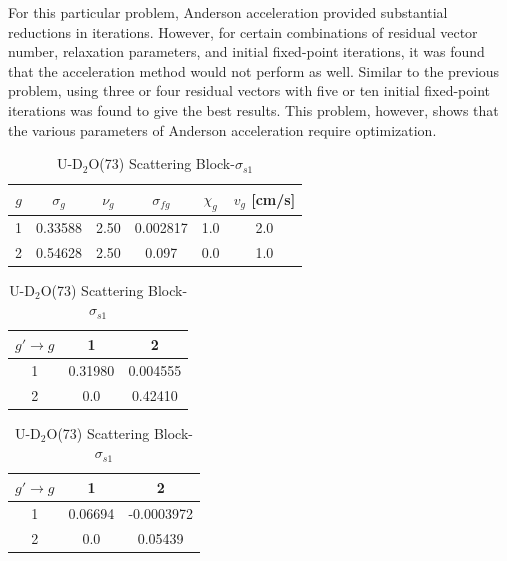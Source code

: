 For this particular problem, Anderson acceleration provided substantial reductions in iterations. However, for certain combinations of residual vector number, relaxation parameters, and initial fixed-point iterations, it was found that the acceleration method would not perform as well. Similar to the previous problem, using three or four residual vectors with five or ten initial fixed-point iterations was found to give the best results. This problem, however, shows that the various parameters of Anderson acceleration require optimization.

\begin{table}[!htbp]
	\caption{Two-Group U-D$_{2}$O Problem Cross Sections (cm$^{-1}$)}
	\label{table:D2O-Sood73}
	\begin{subtable}[!htbp]{1.0\textwidth}
		\centering{}
		\begin{tabular}{@{}cccccc@{}}\toprule
			$g$ & $\sigma_{g} $ & $\nu_{g}$ & $\sigma_{fg}$ & $\chi_{g}$ & $v_{g}$ [cm/s] \\ 
        			\midrule
			1 & 0.33588  & 2.50 & 0.002817 & 1.0 & 2.0 \\
			2 & 0.54628  & 2.50 & 0.097 & 0.0 & 1.0 \\
			\bottomrule
		\end{tabular}
	\caption{U-D$_{2}$O(73) Cross Sections}
	\end{subtable}%
	\vspace{0.25cm}
	\begin{subtable}[!htbp]{1.0\textwidth}
	\centering{}
	\begin{tabular}{@{}ccc@{}}\toprule
	$g' \rightarrow g$ & 1 & 2 \\ 
        \midrule
	1 & 0.31980 & 0.004555   \\
	2 & 0.0 & 0.42410  \\
	\bottomrule
	\end{tabular}
	\caption{U-D$_{2}$O(73) Scattering Block-$\sigma_{s0}$}
	\end{subtable}
		\begin{subtable}[!htbp]{1.0\textwidth}
	\centering{}
	\begin{tabular}{@{}ccc@{}}\toprule
	$g' \rightarrow g$ & 1 & 2 \\ 
        \midrule
	1 & 0.06694 & -0.0003972 \\
	2 & 0.0 & 0.05439  \\
	\bottomrule
	\end{tabular}
	\caption{U-D$_{2}$O(73) Scattering Block-$\sigma_{s1}$}
	\end{subtable}
\end{table}

